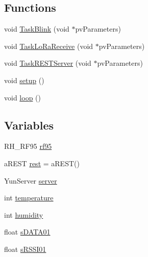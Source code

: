 \subsection*{Functions}
\begin{DoxyCompactItemize}
\item 
void \hyperlink{Yun__Dragino__Server__LoRa__WAN__RTOS_8ino_aac5118a046f2d7f65f4a0db3a4a20d22}{Task\-Blink} (void $\ast$pv\-Parameters)
\item 
void \hyperlink{Yun__Dragino__Server__LoRa__WAN__RTOS_8ino_a9e035ad3ce340b82dbc5971f3d9b4339}{Task\-Lo\-Ra\-Receive} (void $\ast$pv\-Parameters)
\item 
void \hyperlink{Yun__Dragino__Server__LoRa__WAN__RTOS_8ino_a8392b3098ed5a39a4e19ddd2a137c8cf}{Task\-R\-E\-S\-T\-Server} (void $\ast$pv\-Parameters)
\item 
void \hyperlink{Yun__Dragino__Server__LoRa__WAN__RTOS_8ino_a4fc01d736fe50cf5b977f755b675f11d}{setup} ()
\item 
void \hyperlink{Yun__Dragino__Server__LoRa__WAN__RTOS_8ino_afe461d27b9c48d5921c00d521181f12f}{loop} ()
\end{DoxyCompactItemize}
\subsection*{Variables}
\begin{DoxyCompactItemize}
\item 
R\-H\-\_\-\-R\-F95 \hyperlink{Yun__Dragino__Server__LoRa__WAN__RTOS_8ino_ac741fa4056d5cbbcc0ab38fa7d8c6ce3}{rf95}
\item 
a\-R\-E\-S\-T \hyperlink{Yun__Dragino__Server__LoRa__WAN__RTOS_8ino_a26fae33ed4ee26417d9384858ac417f7}{rest} = a\-R\-E\-S\-T()
\item 
Yun\-Server \hyperlink{Yun__Dragino__Server__LoRa__WAN__RTOS_8ino_a4e0c9ea4f8c666a7b51971ca06aae4e0}{server}
\item 
int \hyperlink{Yun__Dragino__Server__LoRa__WAN__RTOS_8ino_a0ac2a299549fcca3cd14e4c1ac2087d2}{temperature}
\item 
int \hyperlink{Yun__Dragino__Server__LoRa__WAN__RTOS_8ino_a405f237eaa8a513a9682fbb6e44c4860}{humidity}
\item 
float \hyperlink{Yun__Dragino__Server__LoRa__WAN__RTOS_8ino_ad1c7a4ba4c912546937bc44b4e27d68c}{s\-D\-A\-T\-A01}
\item 
float \hyperlink{Yun__Dragino__Server__LoRa__WAN__RTOS_8ino_af240a078aeaa4edc1f730eb08995a89d}{s\-R\-S\-S\-I01}
\end{DoxyCompactItemize}


